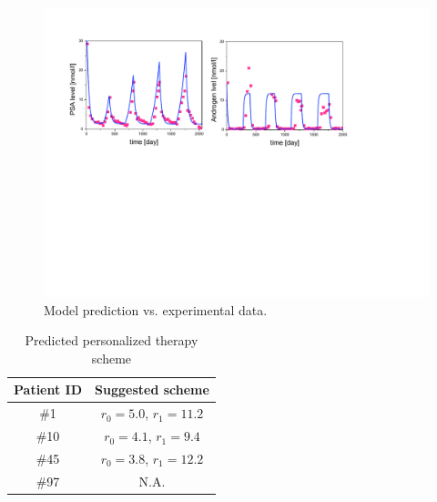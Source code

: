 \begin{figure}[htb]
\centering
\includegraphics[scale=0.47]{fig-fitting}
\caption{Model prediction vs. experimental data.}
\label{fitting}
\vspace{-0.7cm}
\end{figure}


\begin{table}[h]
\caption{Predicted personalized therapy scheme\label{prostate2}}
\centering
\begin{tabular}{|c|c|}
\hline
Patient ID   & Suggested scheme  \\\hline
\#1 & $r_0=5.0$, $r_1=11.2$ \\
\#10 & $r_0=4.1$, $r_1=9.4$ \\
\#45 &  $r_0=3.8$, $r_1=12.2$ \\
\#97 &  N.A. \\
\hline
\end{tabular}
\end{table}






